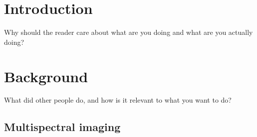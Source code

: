 \documentclass{l4proj}
\begin{document}
%
%
%
%
%
%
%
\chapter{Introduction}



Why should the reader care about what are you doing and what are you actually doing?



\chapter{Background}
What did other people do, and how is it relevant to what you want to do?

\section{Multispectral imaging}
\end{document}
